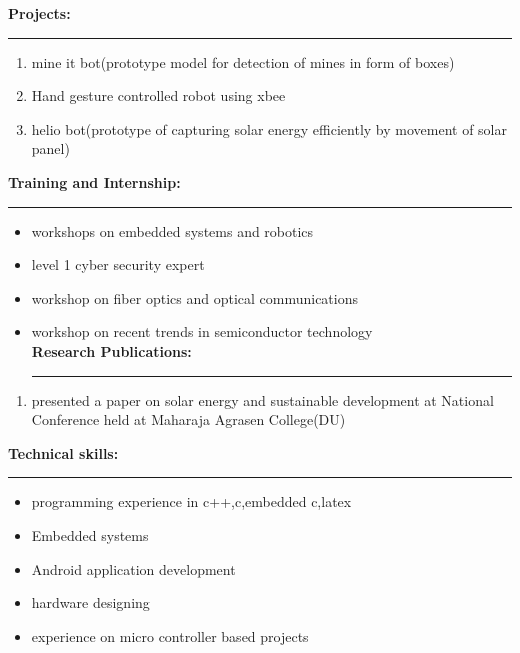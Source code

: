 \documentclass[a4paper,10pt]{article}
\begin{document}
\begin{flushleft}
		\bigskip
    \textbf{Projects:}\\
    \hrule
	\smallskip
      \begin{enumerate}
      	\item  mine it bot(prototype model for detection of mines in form of boxes)
      	\item  Hand gesture controlled robot using xbee
      	\item  helio bot(prototype of capturing solar energy efficiently by movement of solar panel) 
      \end{enumerate}
      \textbf{Training and Internship:}\\
  \hrule
   \begin{itemize}
   	\item  workshops on embedded systems and robotics\\
   	\item  level 1 cyber security expert\\
   	\item  workshop on fiber optics and optical communications\\
   	\item  workshop on recent trends in semiconductor technology\\
   	\bigskip
   	\textbf{Research Publications:}\\
   	\medskip
  \hrule
 \end{itemize}
  \begin{enumerate}
   \item  presented a paper on solar energy and sustainable development at National Conference held at Maharaja Agrasen College(DU)\\ \medskip
   \end{enumerate}
   \textbf{Technical skills:}\\
  \hrule
   \begin{itemize}
   	\item programming experience in c++,c,embedded c,latex\\
   	\item  Embedded systems\\
   	\item  Android application development\\
   	\item  hardware designing \\
   \item   experience on micro controller based projects\\
    \end{itemize}

\end{flushleft}
\end{document}
